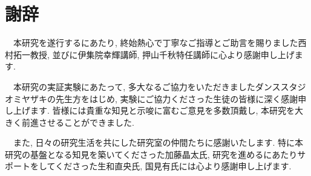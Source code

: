 \chapter*{謝辞}
　本研究を遂行するにあたり, 終始熱心で丁寧なご指導とご助言を賜りました西村拓一教授, 並びに伊集院幸輝講師, 押山千秋特任講師に心より感謝申し上げます.

　本研究の実証実験にあたって, 多大なるご協力をいただきましたダンススタジオミヤザキの先生方をはじめ, 実験にご協力くださった生徒の皆様に深く感謝申し上げます. 皆様には貴重な知見と示唆に富むご意見を多数頂戴し, 本研究を大きく前進させることができました.

　また, 日々の研究生活を共にした研究室の仲間たちに感謝いたします. 特に本研究の基盤となる知見を築いてくださった加藤晶太氏, 研究を進めるにあたりサポートをしてくださった生和直央氏, 国見有氏には心より感謝申し上げます.